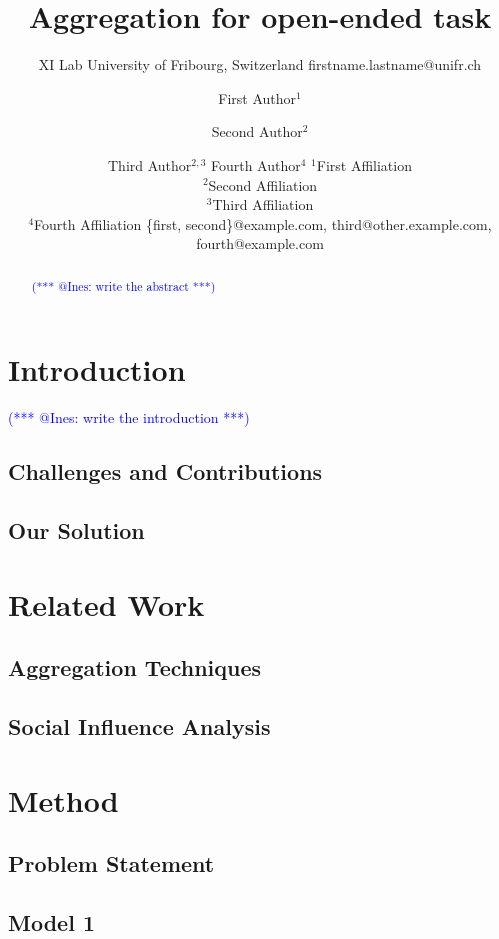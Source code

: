 \documentclass{article}
\title{Aggregation for open-ended task}
\author{
    XI Lab
    \affiliations
    University of Fribourg, Switzerland\emails
    firstname.lastname@unifr.ch
}
\author{
First Author$^1$
\and
Second Author$^2$\and
Third Author$^{2,3}$\And
Fourth Author$^4$
\affiliations
$^1$First Affiliation\\
$^2$Second Affiliation\\
$^3$Third Affiliation\\
$^4$Fourth Affiliation
\emails
\{first, second\}@example.com,
third@other.example.com,
fourth@example.com
}
\makeatletter
\newcommand{\iar}[1]{\textcolor{blue}{(*** @Ines: #1 ***)}}
\makeatother
\begin{document}
\maketitle

\begin{abstract}
\iar{write the abstract}
\end{abstract}

\section{Introduction}

\iar{write the introduction}

\subsection{Challenges and Contributions}


\subsection{Our Solution}



\section{Related Work}



\subsection{Aggregation Techniques }



\subsection{Social Influence Analysis}




\section{Method}

\subsection{Problem Statement}


\subsection{Model 1}
\end{document}
